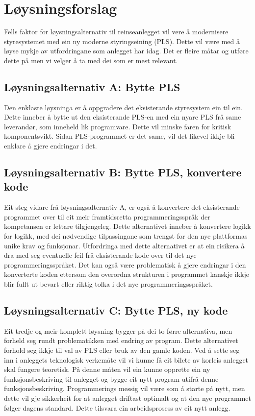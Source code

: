 \newpage
\section{Løysningsforslag}

Fells faktor for løysningsalternativ til reinseanlegget vil vere å modernisere
styresystemet med ein ny moderne styringseining (PLS). 
Dette vil være med å løyse mykje av utfordringane som anlegget har idag. 
Det er fleire måtar og utføre dette på men vi velger å ta med dei som er mest relevant.
\newline
\subsection{Løysningsalternativ A: Bytte PLS}
Den enklaste løysninga er å oppgradere det eksisterande styresystem ein til ein. 
Dette inneber å bytte ut den eksisterande PLS-en med ein nyare PLS frå same leverandør, som inneheld lik programvare.
Dette vil minske faren for kritisk komponentsvikt. Sidan PLS-programmet er det same, 
vil det likevel ikkje bli enklare å gjere endringar i det.

\subsection{Løysningsalternativ B: Bytte PLS, konvertere kode}
Eit steg vidare frå løysningsalternativ A, er også å konvertere det eksisterande programmet over til eit meir
framtidsretta programmeringsspråk der kompetansen er lettare tilgjengeleg. Dette alternativet inneber å konvertere logikk for logikk,
med dei nødvendige tilpassingane som trengst for den nye plattformas unike krav og funksjonar.
\newline \newline
Utfordringa med dette alternativet er at ein risikera å dra med seg eventuelle feil frå eksisterande
kode over til det nye programmeringsspråket. Det kan også være problematisk å gjere endringar
i den konverterte koden ettersom den overordna strukturen i programmet
kanskje ikkje blir fullt ut bevart eller riktig tolka i det nye programmeringsspråket.

\subsection{Løysningsalternativ C: Bytte PLS, ny kode}
Eit tredje og meir komplett løysning bygger på dei to førre alternativa, men forheld seg rundt problematikken med endring av program.
Dette alternativet forhold seg ikkje til val av PLS eller bruk av den gamle koden.
\newline \newline
Ved å sette seg inn i anleggets teknologisk verkemåte vil vi kunne få eit bilete av korleis anlegget skal fungere teoretisk.
På denne måten vil ein kunne opprette ein ny funksjonsbeskriving til anlegget og bygge eit nytt program utifrå denne funksjonsbeskriving.
Programmerings messig vil være som å starte på nytt, men dette vil gje sikkerheit for at anlegget driftast optimalt og at den nye programmet følger
dagens standard. Dette tilsvara ein arbeidsprosess av eit nytt anlegg.

